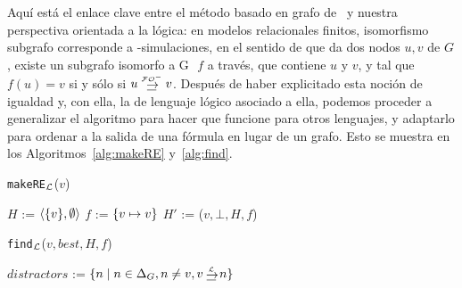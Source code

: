 {Aqu\'i est\'a el enlace clave entre el m\'etodo basado en grafo
de~\cite{Krahmer2003} y nuestra perspectiva orientada a la l\'ogica: en
modelos relacionales finitos, isomorfismo subgrafo corresponde a
\EPFOL-simulaciones, en el sentido de que da dos nodos $u,v$ de
$G$, existe un subgrafo isomorfo a G $ $ $ f $ a través, que contiene $ u $ y
$v$, y tal que $f(u)=v$ si y s\'olo si $u \simul{\+\EPFOL} v$.
%
Despu\'es de haber explicitado esta noci\'on de igualdad y, con ella, la de
lenguaje l\'ogico asociado a ella, podemos proceder a generalizar el
algoritmo para hacer que funcione para otros lenguajes, y adaptarlo para
ordenar a la salida de una f\'ormula en lugar de un grafo. Esto se muestra en los
Algoritmos~\ref{alg:makeRE} y~\ref{alg:find}.
%
\begin{center}\begin{minipage}[t]{5.1cm}%
\begin{algorithm}[H]\small
{}

\caption{\small \texttt{makeRE}$_{\mathcal{L}}$($v$)}\label{alg:makeRE}


\BlankLine

\vspace{3.0pt}

\BlankLine

$H$ := $\langle \{v\},\emptyset \rangle$\; $f$ := $\{v \mapsto v\}$\;
$H'$ := \findGraph($v, \bot, H, f$)\;
\BlankLine
{}\;
\end{algorithm}
  \end{minipage}
\hspace{.05cm}
  \begin{minipage}[t]{6.8cm}%
\begin{algorithm}[H] \small
{} 


\caption{\small \texttt{find}$_{\mathcal{L}}$($v, \mathit{best},
H,f$)}\label{alg:find}

 $\mathit{distractors}$ :=
$\cset{n \mid n \in \Delta_G, n \neq v , v \simul{\+L} n}$\;
 \;
\end{algorithm}
  \end{minipage}%
\end{center}

}
